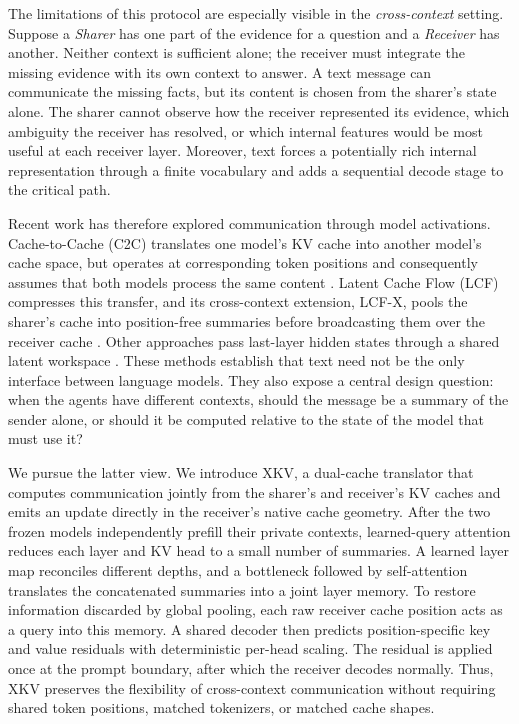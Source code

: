 \documentclass[11pt]{article}
\newcommand{\xkv}{\textsc{XKV}\xspace}
\newcommand{\lcfx}{\textsc{LCF-X}\xspace}
\newcommand{\sharer}{\textit{Sharer}\xspace}
\newcommand{\receiver}{\textit{Receiver}\xspace}
\begin{document}
The limitations of this protocol are especially visible in the
\emph{cross-context} setting. Suppose a \sharer has one part of the evidence for
a question and a \receiver has another. Neither context is sufficient alone;
the receiver must integrate the missing evidence with its own context to answer.
A text message can communicate the missing facts, but its content is chosen from
the sharer's state alone. The sharer cannot observe how the receiver represented
its evidence, which ambiguity the receiver has resolved, or which internal
features would be most useful at each receiver layer. Moreover, text forces a
potentially rich internal representation through a finite vocabulary and adds a
sequential decode stage to the critical path.

Recent work has therefore explored communication through model activations.
Cache-to-Cache (C2C) translates one model's KV cache into another model's cache
space, but operates at corresponding token positions and consequently assumes
that both models process the same content \cite{fu2025cachetocache}. Latent Cache
Flow (LCF) compresses this transfer, and its cross-context extension, \lcfx,
pools the sharer's cache into position-free summaries before broadcasting them
over the receiver cache \cite{rossi2026latentcacheflow}. Other approaches pass
last-layer hidden states through a shared latent workspace
\cite{du2025interlat,zou2025latentmas}. These methods establish that text need
not be the only interface between language models. They also expose a central
design question: when the agents have different contexts, should the message be
a summary of the sender alone, or should it be computed relative to the state of
the model that must use it?

We pursue the latter view. We introduce \xkv, a dual-cache translator that
computes communication jointly from the sharer's and receiver's KV caches and
emits an update directly in the receiver's native cache geometry. After the two
frozen models independently prefill their private contexts, learned-query
attention reduces each layer and KV head to a small number of summaries. A
learned layer map reconciles different depths, and a bottleneck followed by
self-attention translates the concatenated summaries into a joint layer memory.
To restore information discarded by global pooling, each raw receiver cache
position acts as a query into this memory. A shared decoder then predicts
position-specific key and value residuals with deterministic per-head scaling.
The residual is applied once at the prompt boundary, after which the receiver
decodes normally. Thus, \xkv preserves the flexibility of cross-context
communication without requiring shared token positions, matched tokenizers, or
matched cache shapes.
\end{document}
